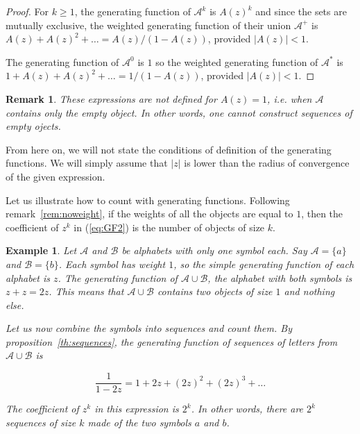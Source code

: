 \documentclass{article}
\newtheorem{example}{Example}
\newtheorem{remark}{Remark}
\begin{document}
\begin{proof}
For $k \geq 1$, the generating function of $\mathcal{A}^k$ is $A(z)^k$ and
since the sets are mutually exclusive, the weighted generating function of
their union $\mathcal{A}^+$ is $A(z) + A(z)^2 + \ldots = A(z) / (1-A(z))$,
provided $|A(z)| < 1$.

The generating function of $\mathcal{A}^0$ is $1$ so the weighted
generating function of $\mathcal{A}^*$ is $1 + A(z) + A(z)^2 + \ldots =
1 / (1-A(z))$, provided $|A(z)| < 1$.
\end{proof}

\begin{remark}
These expressions are not defined for $A(z) = 1$, \textit{i.e.} when
$\mathcal{A}$ contains only the empty object. In other words, one cannot
construct sequences of empty ojects.
\end{remark}

From here on, we will not state the conditions of definition of the
generating functions. We will simply assume that $|z|$ is lower than the
radius of convergence of the given expression.

Let us illustrate how to count with generating functions. Following
remark~\ref{rem:noweight}, if the weights of all the objects are equal to
$1$, then the coefficient of $z^k$ in (\ref{eq:GF2}) is the number of
objects of size $k$.

\begin{example}
\label{ex:noweight}
Let $\mathcal{A}$ and $\mathcal{B}$ be alphabets with only one symbol
each. Say $\mathcal{A} = \{a\}$ and $\mathcal{B} = \{b\}$. Each symbol
has weight $1$, so the simple generating function of each alphabet is $z$.
The generating function of $\mathcal{A} \cup \mathcal{B}$, the alphabet
with both symbols is $z+z = 2z$. This means that $\mathcal{A} \cup
\mathcal{B}$ contains two objects of size $1$ and nothing else.

Let us now combine the symbols into sequences and count them. By
proposition~\ref{th:sequences}, the generating function of sequences of
letters from $\mathcal{A} \cup \mathcal{B}$ is

\begin{equation*}
\frac{1}{1-2z} = 1 + 2z + (2z)^2 + (2z)^3 + \ldots
\end{equation*}

The coefficient of $z^k$ in this expression is $2^k$. In other words,
there are $2^k$ sequences of size $k$ made of the two symbols $a$ and $b$.
\end{example}
\end{document}
